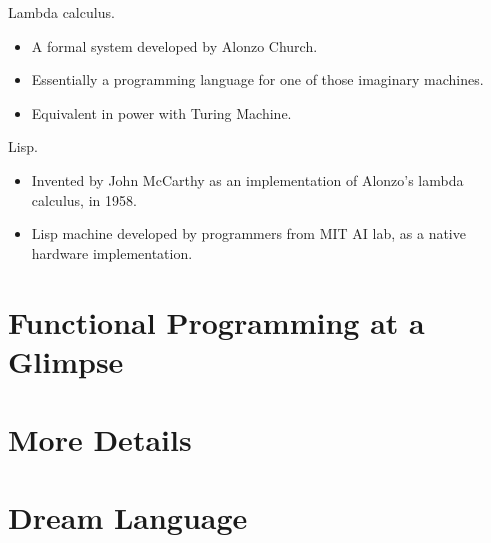 \documentclass[12pt,hyperref=true,mathserif]{beamer}
\begin{document}
\begin{frame}
  Lambda calculus.
  \begin{itemize}
  \item A formal system developed by Alonzo Church.
  \item Essentially a programming language for one of those imaginary
    machines.
  \item Equivalent in power with Turing Machine.
  \end{itemize}
  Lisp.
  \begin{itemize}
  \item Invented by John McCarthy as an implementation of Alonzo's
    lambda calculus, in 1958.
  \item Lisp machine developed by programmers from MIT AI lab, as a
    native hardware implementation.
  \end{itemize}
\end{frame}

\section{Functional Programming at a Glimpse}


\begin{frame}
  
\end{frame}

\section{More Details}


\begin{frame}
  
\end{frame}

\section{Dream Language}


\begin{frame}
  
\end{frame}
\end{document}
